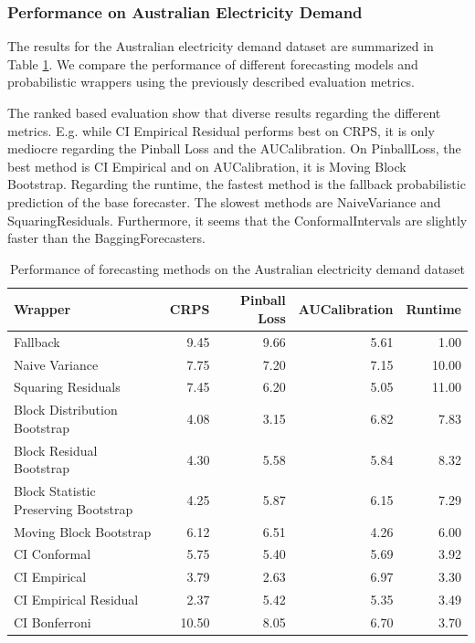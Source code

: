 \subsubsection{Performance on Australian Electricity Demand}
The results for the Australian electricity demand dataset are summarized in Table \ref{table:aus_elec_results}. We compare the performance of different forecasting models and probabilistic wrappers using the previously described evaluation metrics. 

The ranked based evaluation show that diverse results regarding the different metrics. E.g. while CI Empirical Residual performs best on CRPS, it is only mediocre regarding the Pinball Loss and the AUCalibration. On PinballLoss, the best method is CI Empirical and on AUCalibration, it is Moving Block Bootstrap. Regarding the runtime, the fastest method is the fallback probabilistic prediction of the base forecaster. The slowest methods are NaiveVariance and SquaringResiduals. Furthermore, it seems that the ConformalIntervals are slightly faster than the BaggingForecasters.

\begin{table}[h]
    \centering
    \caption{Performance of forecasting methods on the Australian electricity demand dataset}
    \label{table:aus_elec_results}
\begin{tabular}{lrrrr}
\toprule
Wrapper & CRPS & Pinball Loss & AUCalibration & Runtime \\
\midrule
Fallback & 9.45 & 9.66 & 5.61 & 1.00 \\
Naive Variance & 7.75 & 7.20 & 7.15 & 10.00 \\
Squaring Residuals & 7.45 & 6.20 & 5.05 & 11.00 \\
Block Distribution Bootstrap & 4.08 & 3.15 & 6.82 & 7.83 \\
Block Residual Bootstrap & 4.30 & 5.58 & 5.84 & 8.32 \\
Block Statistic Preserving Bootstrap & 4.25 & 5.87 & 6.15 & 7.29 \\
Moving Block Bootstrap & 6.12 & 6.51 & 4.26 & 6.00 \\
CI Conformal & 5.75 & 5.40 & 5.69 & 3.92 \\
CI Empirical & 3.79 & 2.63 & 6.97 & 3.30 \\
CI Empirical Residual & 2.37 & 5.42 & 5.35 & 3.49 \\
CI Bonferroni  & 10.50 & 8.05 & 6.70 & 3.70 \\
\bottomrule
\end{tabular}

\end{table}

